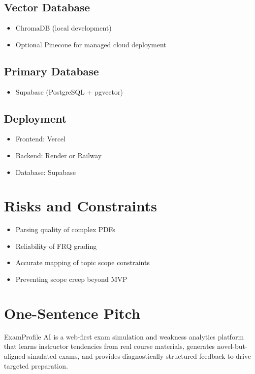 \documentclass[11pt]{article}
\begin{document}
\subsection{Vector Database}
\begin{itemize}
\item ChromaDB (local development)
\item Optional Pinecone for managed cloud deployment
\end{itemize}

\subsection{Primary Database}
\begin{itemize}
\item Supabase (PostgreSQL + pgvector)
\end{itemize}

\subsection{Deployment}
\begin{itemize}
\item Frontend: Vercel
\item Backend: Render or Railway
\item Database: Supabase
\end{itemize}

\section{Risks and Constraints}

\begin{itemize}
\item Parsing quality of complex PDFs
\item Reliability of FRQ grading
\item Accurate mapping of topic scope constraints
\item Preventing scope creep beyond MVP
\end{itemize}

\section{One-Sentence Pitch}
ExamProfile AI is a web-first exam simulation and weakness analytics platform that learns instructor tendencies from real course materials, generates novel-but-aligned simulated exams, and provides diagnostically structured feedback to drive targeted preparation.
\end{document}
